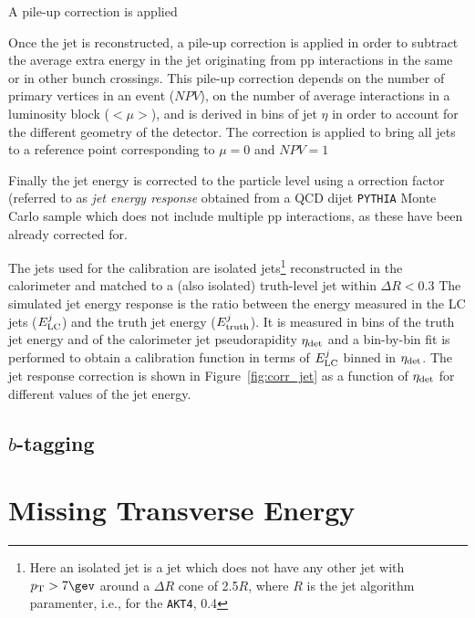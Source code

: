 A pile-up correction is applied

Once the jet is reconstructed, a 
pile-up correction is applied in 
order to subtract the average extra 
energy in the jet originating from pp 
interactions in the same or in other bunch crossings. 
This pile-up correction depends on the number of primary vertices in an event ($NPV$),
on the number of average interactions in 
a luminosity block ($<\mu>$), and is derived in bins of jet $\eta$ in order to
account for the different geometry of the detector. The
correction is applied to bring all jets to a 
reference point corresponding to $\mu=0$ and $NPV = 1$

Finally the jet energy is corrected to the particle
level using a orrection factor (referred to as 
{\it jet energy response} obtained from a QCD 
dijet \texttt{PYTHIA} Monte Carlo sample
which does not include
multiple pp interactions, as these have been already
corrected for.

The jets used for the calibration are isolated jets\footnote{Here an
isolated jet is a jet which does not have any other
jet with $\pt>7\gev$
around a $\Delta R$ cone of 2.5$R$, where $R$ is
the jet algorithm paramenter, i.e., for the \texttt{AKT4}, 0.4}
reconstructed in the calorimeter and matched to
a (also isolated) truth-level jet within $\Delta R<0.3$
The simulated jet energy response 
is the ratio between the energy measured in the LC jets ($E_{\rm LC}^j$)
and the truth jet energy ($E_{\rm truth}^j$). It is measured in bins of
the truth jet energy and of the calorimeter jet pseudorapidity $\eta_{\rm det}$
and a bin-by-bin fit is performed to obtain a
calibration function in terms of $E_{\rm LC}^j$
binned in $\eta_{\rm det}$.
The jet response correction is
shown in Figure~\ref{fig:corr_jet}
as a function of $\eta_{\rm det}$
for different values of the jet energy.


\subsection{$b$-tagging}
\label{sec:btag}

\section{Missing Transverse Energy}
\label{sec:met}
